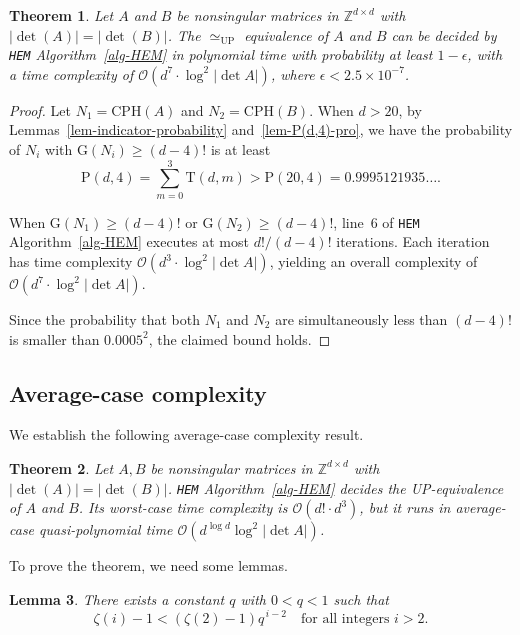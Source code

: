 \documentclass[reqno, 12pt]{article}
\newtheorem{thm}{Theorem}[section]
\newtheorem{lem}[thm]{Lemma}
\theoremstyle{mydefinition}
\theoremstyle{myremark}
\numberwithin{algorithm}{section}
\def\Z{\mathbb{Z}}
\begin{document}
\begin{thm}\label{thm-HEM-prob}
Let $A$ and $B$ be nonsingular matrices in $\mathbb{Z}^{d \times d}$ with $|\det(A)| = |\det(B)|$.
The $\simeq_{\mathrm{UP}}$ equivalence of $A$ and $B$ can be decided by \emph{\texttt{HEM}} Algorithm~\ref{alg-HEM} in polynomial time with probability at least $1 - \epsilon$, with a time complexity of $\mathcal O (d^7 \cdot \log^2  |\det A|)$, where $\epsilon < 2.5 \times 10^{-7}$.
\end{thm}
\begin{proof}
Let $N_1=\mathrm{CPH}(A)$ and $N_2=\mathrm{CPH}(B)$. When $d>20$, by Lemmas~\ref{lem-indicator-probability} and~\ref{lem-P(d,4)-pro}, we have  the probability of $N_i$   with $\mathrm{G}(N_i)\geq (d-4)!$ is at least
$$\mathrm P(d,4)=\sum_{m=0}^{3} \mathrm{T}(d,m) > \mathrm P(20,4)=0.9995121935\ldots .$$

When $\mathrm{G}(N_1) \geq (d-4)!$ or $\mathrm{G}(N_2) \geq (d-4)!$, line~6 of \texttt{HEM} Algorithm~\ref{alg-HEM} executes at most $d!/(d-4)!$ iterations. Each iteration has time complexity \(\mathcal {O} (d^{3} \cdot \log^{2} |\det A|)\), yielding an overall complexity of \(\mathcal{O} (d^{7} \cdot \log^{2} |\det A|)\).

Since the probability that both $N_{1}$ and $N_{2}$ are simultaneously less than $(d-4)!$ is smaller than $0.0005 ^2$, the claimed bound holds.
\end{proof}





\subsection{Average-case complexity}
We establish the following average-case complexity result.
\begin{thm}\label{thm-average-poly-time}
Let $A,B$ be nonsingular matrices in $\Z^{d\times d}$ with $|\det(A)|=|\det(B)|$.
 \emph{\texttt{HEM}} Algorithm~\ref{alg-HEM} decides the UP-equivalence of $A$ and $B$.
Its worst-case time complexity is $\mathcal O(d!\cdot d^3)$, but it runs in average-case quasi-polynomial time  $\mathcal O(d^{\log d} \log^2  |\det A|)$.
\end{thm}
To prove the theorem, we need some lemmas.

\begin{lem}\label{lem-average-q}
    There exists a constant $q$ with $0 < q < 1$ such that
    \[
        \zeta(i)-1 < (\zeta(2)-1)q^{\,i-2} \quad \text{for all integers } i > 2.
    \]
\end{lem}
\end{document}
